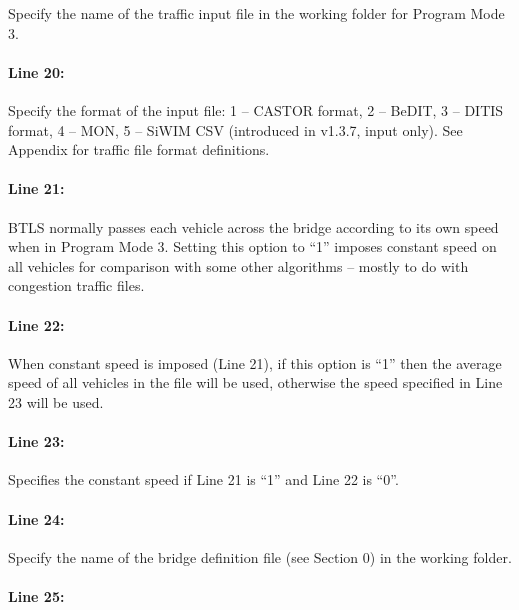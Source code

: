 \documentclass[
]{article}
\begin{document}
Specify the name of the traffic input file in the working folder for
Program Mode 3.

\paragraph*{Line 20:}\label{line-20}

Specify the format of the input file: 1 -- CASTOR format, 2 -- BeDIT, 3
-- DITIS format, 4 -- MON, 5 -- SiWIM CSV (introduced in v1.3.7, input
only). See Appendix for traffic file format definitions.

\paragraph*{Line 21:}\label{line-21}

BTLS normally passes each vehicle across the bridge according to its own
speed when in Program Mode 3. Setting this option to ``1'' imposes
constant speed on all vehicles for comparison with some other algorithms
-- mostly to do with congestion traffic files.

\paragraph*{Line 22:}\label{line-22}

When constant speed is imposed (Line 21), if this option is ``1'' then
the average speed of all vehicles in the file will be used, otherwise
the speed specified in Line 23 will be used.

\paragraph*{Line 23:}\label{line-23}

Specifies the constant speed if Line 21 is ``1'' and Line 22 is ``0''.

\paragraph*{Line 24:}\label{line-24}

Specify the name of the bridge definition file (see Section 0) in the
working folder.

\paragraph*{Line 25:}\label{line-25}
\end{document}

